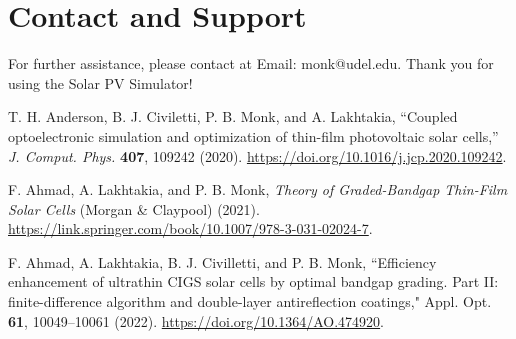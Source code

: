 \documentclass[10pt]{article}
\begin{document}
\section{Contact and Support}
For further assistance, please contact at Email: monk@udel.edu. 
Thank you for using the Solar PV Simulator!

\newpage
\begin{thebibliography}{99}

T. H. Anderson, B. J. Civiletti, P. B. Monk, and A. Lakhtakia, ``Coupled optoelectronic simulation and optimization of thin-film photovoltaic
solar cells,''  \textit{J. Comput. Phys.} \textbf{407},  109242 (2020). \href{https://doi.org/10.1016/j.jcp.2020.109242}{https://doi.org/10.1016/j.jcp.2020.109242}.


F. Ahmad, A. Lakhtakia, and P. B. Monk, \textit{Theory of Graded-Bandgap Thin-Film Solar Cells} (Morgan \& Claypool) (2021). 
\href{https://link.springer.com/book/10.1007/978-3-031-02024-7}{https://link.springer.com/book/10.1007/978-3-031-02024-7}.
	
F. Ahmad, A. Lakhtakia, B. J. Civilletti, and P. B. Monk, ``Efficiency enhancement of ultrathin CIGS solar
cells by optimal bandgap grading. Part II: finite-difference algorithm and double-layer antireflection coatings,"
{Appl. Opt.} {\bf 61},  10049--10061 (2022). \href{https://doi.org/10.1364/AO.474920}{https://doi.org/10.1364/AO.474920}.

\end{thebibliography}
\end{document}
